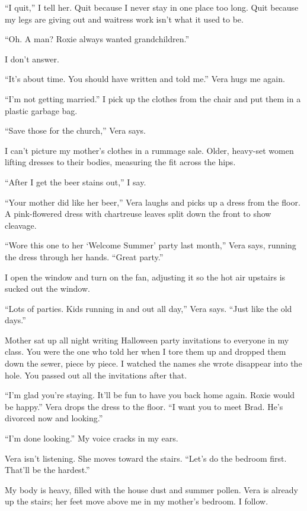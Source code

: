 \documentclass[
]{article}
\begin{document}
``I quit,'' I tell her. Quit because I never stay in one place too long.
Quit because my legs are giving out and waitress work isn't what it used
to be.

``Oh. A man? Roxie always wanted grandchildren.''

I don't answer.

``It's about time. You should have written and told me.'' Vera hugs me
again.

``I'm not getting married.'' I pick up the clothes from the chair and
put them in a plastic garbage bag.

``Save those for the church,'' Vera says.

I can't picture my mother's clothes in a rummage sale. Older, heavy-set
women lifting dresses to their bodies, measuring the fit across the
hips.

``After I get the beer stains out,'' I say.

``Your mother did like her beer,'' Vera laughs and picks up a dress from
the floor. A pink-flowered dress with chartreuse leaves split down the
front to show cleavage.

``Wore this one to her `Welcome Summer' party last month,'' Vera says,
running the dress through her hands. ``Great party.''

I open the window and turn on the fan, adjusting it so the hot air
upstairs is sucked out the window.

``Lots of parties. Kids running in and out all day,'' Vera says. ``Just
like the old days.''

Mother sat up all night writing Halloween party invitations to everyone
in my class. You were the one who told her when I tore them up and
dropped them down the sewer, piece by piece. I watched the names she
wrote disappear into the hole. You passed out all the invitations after
that.

``I'm glad you're staying. It'll be fun to have you back home again.
Roxie would be happy.'' Vera drops the dress to the floor. ``I want you
to meet Brad. He's divorced now and looking.''

``I'm done looking.'' My voice cracks in my ears.

Vera isn't listening. She moves toward the stairs. ``Let's do the
bedroom first. That'll be the hardest.''

My body is heavy, filled with the house dust and summer pollen. Vera is
already up the stairs; her feet move above me in my mother's bedroom. I
follow.
\end{document}
